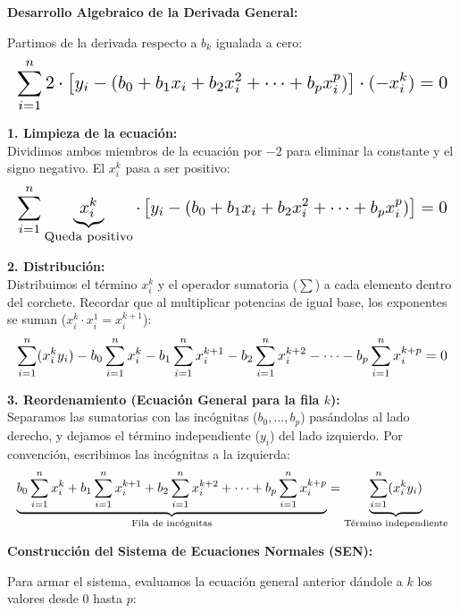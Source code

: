 \documentclass[11pt,a4paper]{article}
\begin{document}
\vspace{0.6cm}
\noindent \textbf{Desarrollo Algebraico de la Derivada General:}

Partimos de la derivada respecto a $b_k$ igualada a cero:
\[
\resizebox{\textwidth}{!}{$\displaystyle
\sum_{i=1}^n 2 \cdot \left[ y_i - (b_0 + b_1 x_i + b_2 x_i^2 + \dots + b_p x_i^p) \right] \cdot (-x_i^k) = 0
$}
\]

\vspace{0.3cm}
\noindent \textbf{1. Limpieza de la ecuación:} \\
Dividimos ambos miembros de la ecuación por $-2$ para eliminar la constante y el signo negativo. El $x_i^k$ pasa a ser positivo:
\[
\resizebox{\textwidth}{!}{$\displaystyle
\sum_{i=1}^n \underbrace{x_i^k}_{\text{Queda positivo}} \cdot \left[ y_i - (b_0 + b_1 x_i + b_2 x_i^2 + \dots + b_p x_i^p) \right] = 0
$}
\]

\vspace{0.3cm}
\noindent \textbf{2. Distribución:} \\
Distribuimos el término $x_i^k$ y el operador sumatoria ($\sum$) a cada elemento dentro del corchete. Recordar que al multiplicar potencias de igual base, los exponentes se suman ($x_i^k \cdot x_i^1 = x_i^{k+1}$):
\[
\resizebox{\textwidth}{!}{$\displaystyle
\sum_{i=1}^n (x_i^k y_i) - b_0 \sum_{i=1}^n x_i^k - b_1 \sum_{i=1}^n x_i^{k+1} - b_2 \sum_{i=1}^n x_i^{k+2} - \dots - b_p \sum_{i=1}^n x_i^{k+p} = 0
$}
\]

\vspace{0.3cm}
\noindent \textbf{3. Reordenamiento (Ecuación General para la fila $k$):} \\
Separamos las sumatorias con las incógnitas ($b_0, \dots, b_p$) pasándolas al lado derecho, y dejamos el término independiente ($y_i$) del lado izquierdo. Por convención, escribimos las incógnitas a la izquierda:
\[
\resizebox{\textwidth}{!}{$\displaystyle
\underbrace{b_0 \sum_{i=1}^n x_i^k + b_1 \sum_{i=1}^n x_i^{k+1} + b_2 \sum_{i=1}^n x_i^{k+2} + \dots + b_p \sum_{i=1}^n x_i^{k+p}}_{\text{Fila de incógnitas}} = \underbrace{\sum_{i=1}^n (x_i^k y_i)}_{\text{Término independiente}}
$}
\]

\vspace{0.8cm}
\noindent \textbf{Construcción del Sistema de Ecuaciones Normales (SEN):}

Para armar el sistema, evaluamos la ecuación general anterior dándole a $k$ los valores desde $0$ hasta $p$:
\end{document}
